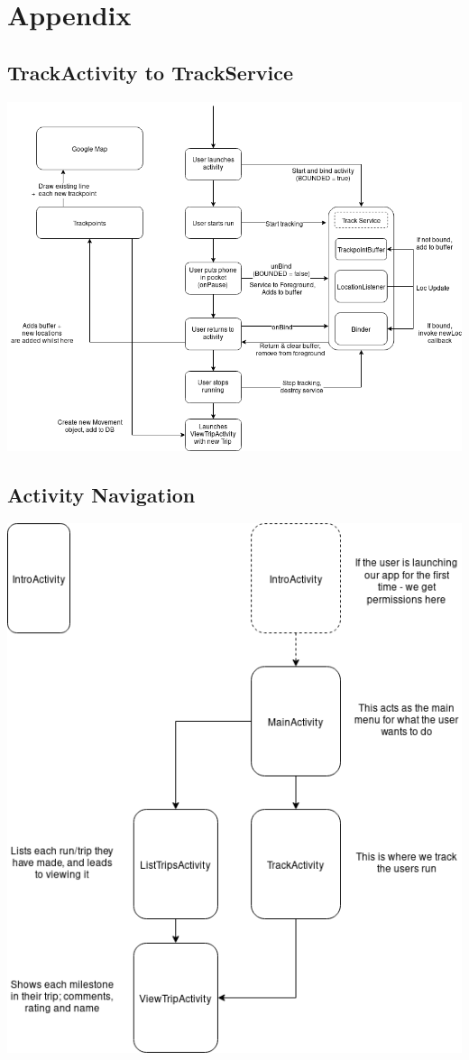 \documentclass[11pt]{article}
\begin{document}
\newpage

\section{Appendix}

\subsection{TrackActivity to TrackService}
\includegraphics[width=\linewidth]{trackservice}

\subsection{Activity Navigation}
\includegraphics[width=\linewidth]{activities_navigation}
\end{document}
